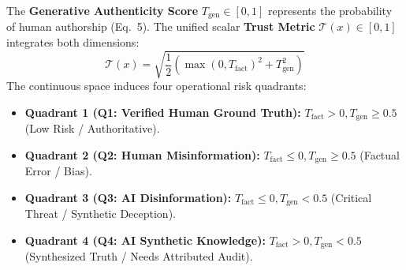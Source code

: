 The \textbf{Generative Authenticity Score} $T_{\text{gen}} \in [0, 1]$ represents the probability of human authorship (Eq.~5). The unified scalar \textbf{Trust Metric} $\mathcal{T}(x) \in [0, 1]$ integrates both dimensions:
\begin{equation}
    \mathcal{T}(x) = \sqrt{\frac{1}{2} \left( \max(0, T_{\text{fact}})^2 + T_{\text{gen}}^2 \right)}
\end{equation}
The continuous space induces four operational risk quadrants:
\begin{itemize}[leftmargin=*, nosep]
    \item \textbf{Quadrant 1 (Q1: Verified Human Ground Truth):} $T_{\text{fact}} > 0, T_{\text{gen}} \ge 0.5$ (Low Risk / Authoritative).
    \item \textbf{Quadrant 2 (Q2: Human Misinformation):} $T_{\text{fact}} \le 0, T_{\text{gen}} \ge 0.5$ (Factual Error / Bias).
    \item \textbf{Quadrant 3 (Q3: AI Disinformation):} $T_{\text{fact}} \le 0, T_{\text{gen}} < 0.5$ (Critical Threat / Synthetic Deception).
    \item \textbf{Quadrant 4 (Q4: AI Synthetic Knowledge):} $T_{\text{fact}} > 0, T_{\text{gen}} < 0.5$ (Synthesized Truth / Needs Attributed Audit).
\end{itemize}
